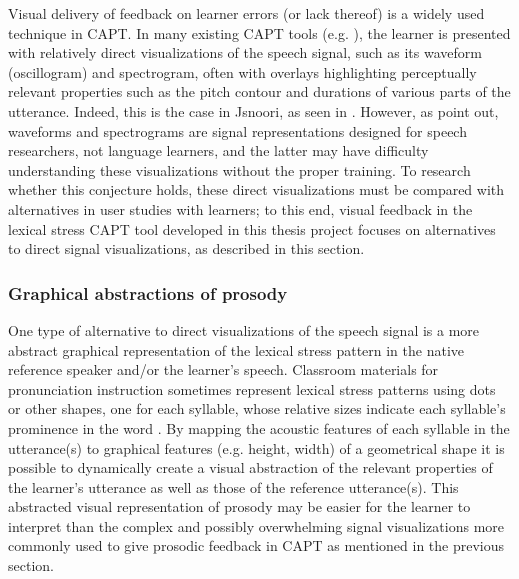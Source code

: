 		Visual delivery of feedback on learner errors (or lack thereof) is a widely used technique in CAPT.
	In many existing CAPT tools %
	(e.g. \cite{Martin2004,Henry2007}),
the learner is presented with relatively direct visualizations of the speech signal, such as its waveform (oscillogram) and spectrogram, often with overlays highlighting perceptually relevant properties such as the pitch contour and durations of various parts of the utterance. 
	Indeed, this is the case in Jsnoori, as seen in .
	However, as \textcite{Neri2002} point out, waveforms and spectrograms are signal representations designed for speech researchers, not language learners, and the latter may have difficulty understanding these visualizations without the proper training. To research whether this conjecture holds, these direct visualizations must be compared with alternatives in user studies with learners; to this end, visual feedback in the lexical stress CAPT tool developed in this thesis project focuses on alternatives to direct signal visualizations, as described in this section.	
		
			\subsubsection{Graphical abstractions of prosody}
			\label{sec:implicit:visual:graphical}
			
			One type of alternative to direct visualizations of the speech signal is a more abstract graphical representation of the lexical stress pattern in the native reference speaker and/or the learner's speech. Classroom materials for pronunciation instruction sometimes represent lexical stress patterns using dots or other shapes, one for each syllable, whose relative sizes indicate each syllable's prominence in the word \citep{Hirschfeld1998}. By mapping the acoustic features of each syllable in the utterance(s) to graphical features (e.g. height, width) of a geometrical shape
			it is possible to dynamically create a visual abstraction of the relevant properties of the learner's utterance as well as those of the reference utterance(s). This abstracted visual representation of prosody may be easier for the learner to interpret than the complex and possibly overwhelming signal visualizations more commonly used to give prosodic feedback in CAPT as mentioned in the previous section.
			
